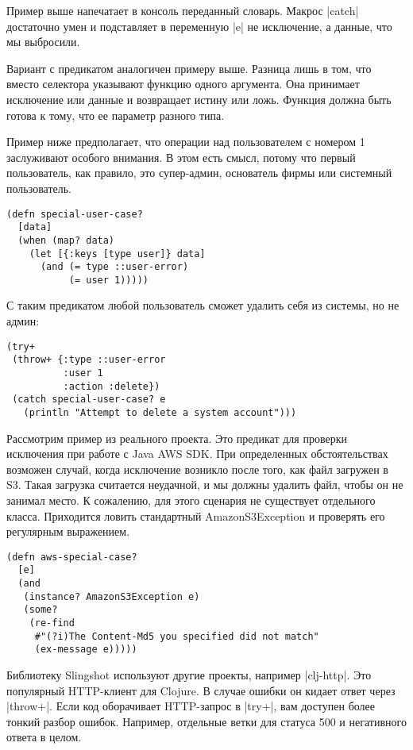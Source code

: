Пример выше напечатает в консоль переданный словарь. Макрос \spverb|catch| достаточно
умен и подставляет в переменную \spverb|e| не исключение, а данные, что мы выбросили.

Вариант с предикатом аналогичен примеру выше. Разница лишь в том, что вместо
селектора указывают функцию одного аргумента. Она принимает исключение или
данные и возвращает истину или ложь. Функция должна быть готова к тому, что ее
параметр разного типа.

Пример ниже предполагает, что операции над пользователем с номером 1 заслуживают
особого внимания. В этом есть смысл, потому что первый пользователь, как
правило, это супер-админ, основатель фирмы или системный пользователь.

\begin{verbatim}
(defn special-user-case?
  [data]
  (when (map? data)
    (let [{:keys [type user]} data]
      (and (= type ::user-error)
           (= user 1)))))
\end{verbatim}

С таким предикатом любой пользователь сможет удалить себя из системы, но не
админ:

\begin{verbatim}
(try+
 (throw+ {:type ::user-error
          :user 1
          :action :delete})
 (catch special-user-case? e
   (println "Attempt to delete a system account")))
\end{verbatim}

Рассмотрим пример из реального проекта. Это предикат для проверки исключения при
работе с Java AWS SDK. При определенных обстоятельствах возможен случай, когда
исключение возникло после того, как файл загружен в S3. Такая загрузка считается
неудачной, и мы должны удалить файл, чтобы он не занимал место. К сожалению, для
этого сценария не существует отдельного класса. Приходится ловить стандартный
AmazonS3Exception и проверять его регулярным выражением.

\begin{verbatim}
(defn aws-special-case?
  [e]
  (and
   (instance? AmazonS3Exception e)
   (some?
    (re-find
     #"(?i)The Content-Md5 you specified did not match"
     (ex-message e)))))
\end{verbatim}

Библиотеку Slingshot используют другие проекты, например \spverb|clj-http|. Это
популярный HTTP-клиент для Clojure. В случае ошибки он кидает ответ через
\spverb|throw+|. Если код оборачивает HTTP-запрос в \spverb|try+|, вам доступен более тонкий
разбор ошибок. Например, отдельные ветки для статуса 500 и негативного ответа в
целом.

